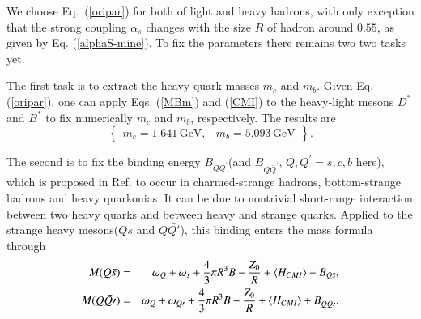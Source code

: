 \documentclass[prd,twocolumn,floatfix,nofootinbib]{revtex4}
\begin{document}
We choose Eq.~(\ref{oripar}) for both of light and heavy hadrons, with only
exception that the strong coupling $\alpha _{s}$ changes with the size $R$
of hadron around $0.55$, as given by Eq. (\ref{alphaS-mine}). To fix the
parameters there remains two two tasks yet.

The first task is to extract the heavy quark masses $m_{c}$ and $m_{b}$.
Given Eq. (\ref{oripar}), one can apply Eqs. (\ref{MBm}) and (\ref{CMI}) to
the heavy-light mesons $D^{\ast }$ and $B^{\ast }$ to fix numerically $m_{c}$
and $m_{b}$, respectively. The results are
\begin{equation}
\begin{Bmatrix}
m_{c}=1.641\,\text{GeV}, & m_{b}=5.093\,\text{GeV}%
\end{Bmatrix}%
.  \label{mcmb}
\end{equation}

The second is to fix the binding energy $B_{QQ^{\prime }}$(and $B_{Q\bar{Q}%
^{\prime }}$, $Q,Q^{\prime }=s,c,b$ here), which is proposed in Ref. \cite%
{KR:2014gca} to occur in charmed-strange hadrons, bottom-strange hadrons and
heavy quarkonias. It can be due to nontrivial short-range interaction
between two heavy quarks and between heavy and strange quarks\cite%
{KR:2014gca,Karliner:2017elp,Karliner:2018bms}. Applied to the strange heavy
mesons($Q\bar{s}$ and $Q\bar{Q\prime }$), this binding enters the mass
formula through
\begin{eqnarray}
M(Q\bar{s}) &=&\omega _{Q}+\omega _{s}+\frac{4}{3}\pi R^{3}B-\frac{Z_{0}}{R}%
+\langle H_{CMI}\rangle +B_{Q\bar{s}},  \notag \\
M(Q\bar{Q\prime }) &=&\omega _{Q}+\omega _{Q\prime }+\frac{4}{3}\pi R^{3}B-%
\frac{Z_{0}}{R}+\langle H_{CMI}\rangle +B_{Q\bar{Q\prime }}.  \label{HLm0}
\end{eqnarray}
\end{document}
